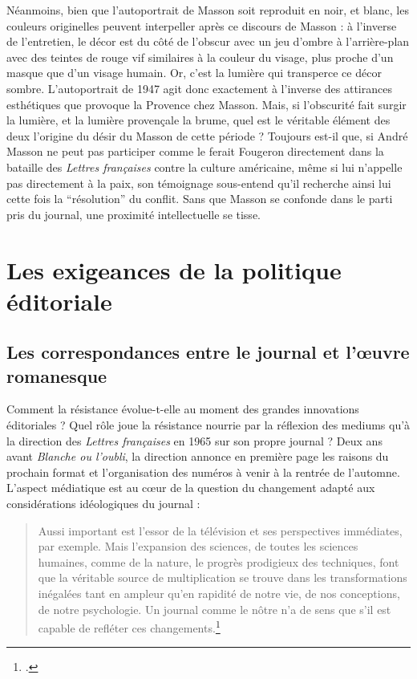 Néanmoins, bien que l’autoportrait de Masson soit reproduit en noir, et blanc, les couleurs originelles peuvent interpeller après ce discours de Masson : à l’inverse de l’entretien, le décor est du côté de l’obscur avec un jeu d’ombre à l’arrière-plan avec des teintes de rouge vif similaires à la couleur du visage, plus proche d’un masque que d’un visage humain. Or, c’est la lumière qui transperce ce décor sombre. L’autoportrait de 1947 agit donc exactement à l’inverse des attirances esthétiques que provoque la Provence chez Masson. Mais, si l’obscurité fait surgir la lumière, et la lumière provençale la brume, quel est le véritable élément des deux l’origine du désir du Masson de cette période ? Toujours est-il que, si André Masson ne peut pas participer comme le ferait Fougeron directement dans la bataille des \emph{Lettres françaises }contre la culture américaine, même si lui n’appelle pas directement à la paix, son témoignage sous-entend qu’il recherche ainsi lui cette fois la \enquote{résolution} du conflit. Sans que Masson se confonde dans le parti pris du journal, une proximité intellectuelle se tisse.  

\section{Les exigeances de la politique éditoriale} 

\subsection{Les correspondances entre le journal et l'\oe{}uvre romanesque}

Comment la résistance évolue-t-elle au moment des grandes innovations éditoriales ? Quel rôle joue la résistance nourrie par la réflexion des mediums qu’à la direction des \emph{Lettres françaises} en 1965 sur son propre journal ? Deux ans avant \emph{Blanche ou l’oubli}, la direction annonce en première page les raisons du prochain format et l'organisation des numéros à venir à la rentrée de l’automne. L’aspect médiatique est au c\oe{}ur de la question du changement adapté aux considérations idéologiques du journal :

\begin{quote}
Aussi important est l’essor de la télévision et ses perspectives immédiates, par exemple. Mais l’expansion des sciences, de toutes les sciences humaines, comme de la nature, le progrès prodigieux des techniques, font que la véritable source de multiplication se trouve dans les transformations inégalées tant en ampleur qu’en rapidité de notre vie, de nos conceptions, de notre psychologie. Un journal comme le nôtre n’a de sens que s’il est capable de refléter ces changements.\footcite{nouvelleformule}\end{quote}


